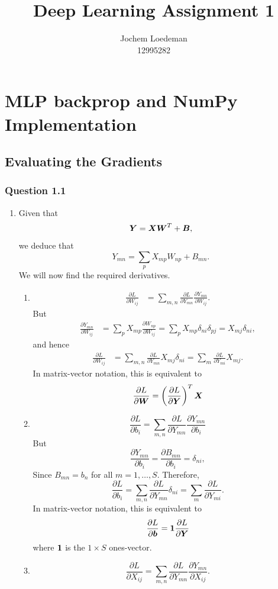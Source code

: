 \documentclass{article}
\title{Deep Learning Assignment 1}
\author{%
  Jochem Loedeman \\
  12995282
}
\newcommand{\pfrac}[2]{\frac{\partial #1}{\partial #2}}
\begin{document}
\maketitle


\section{MLP backprop and NumPy Implementation}
\subsection{Evaluating the Gradients}
\subsubsection*{Question 1.1}
\begin{enumerate}[label=(\alph*)]
	\item 
	Given that
	$$
	\boldsymbol{Y} = \boldsymbol{X} \boldsymbol{W}^T + \boldsymbol{B},
	$$ we deduce that
	$$
	Y_{mn} = \sum_p X_{mp}W_{np} + B_{mn}.
	$$ We will now find the required derivatives.
	\begin{enumerate}[label=(\roman*)]
	\item 
	$$
	\begin{aligned}
	\pfrac{L}{W_{ij}} &= \sum_{m, n}\pfrac{L}{Y_{mn}}\pfrac{Y_{mn}}{W_{ij}}.
	\end{aligned}
	$$ But
	$$
	\begin{aligned}
	\pfrac{Y_{mn}}{W_{ij}} &= \sum_pX_{mp}\pfrac{W_{np}}{W_{ij}} = \sum_pX_{mp}\delta_{ni}\delta_{pj} = X_{mj}\delta_{ni},
	\end{aligned}
	$$ and hence
	$$
	\begin{aligned}
	\pfrac{L}{W_{ij}} &= \sum_{m, n}\pfrac{L}{Y_{mn}}X_{mj}\delta_{ni} = \sum_m \pfrac{L}{Y_{mi}}X_{mj}.
	\end{aligned}
	$$ In matrix-vector notation, this is equivalent to
	$$
	\pfrac{L}{\b W} = \left(\pfrac{L}{\b Y}\right)^T\b X
	$$
	\item
	$$
	\pfrac{L}{b_i} = \sum_{m, n}\pfrac{L}{Y_{mn}}\pfrac{Y_{mn}}{b_i}
	$$
	But
	$$
	\pfrac{Y_{mn}}{b_i} = \pfrac{B_{mn}}{b_i} = \delta_{ni},
	$$ Since $B_{mn} = b_n$ for all $m = 1,\dots, S$. Therefore,
	$$
	\pfrac{L}{b_i} = \sum_{m, n}\pfrac{L}{Y_{mn}}\delta_{ni} = \sum_{m}\pfrac{L}{Y_{mi}}.
	$$ In matrix-vector notation, this is equivalent to
	$$
	\pfrac{L}{\b b} = \b 1 \pfrac{L}{\b Y}
	$$ where $\boldsymbol{1}$ is the $1 \times S$ ones-vector.
	\item 
	$$
	\pfrac{L}{X_{ij}} = \sum_{m, n}\pfrac{L}{Y_{mn}}\pfrac{Y_{mn}}{X_{ij}}.
$$
\end{enumerate}
\end{enumerate}
\end{document}
